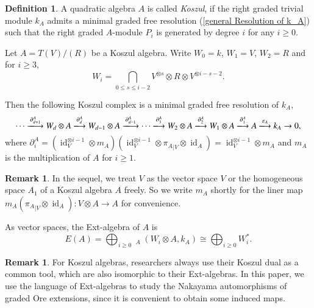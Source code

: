 \documentclass[a4paper,10pt]{amsart}
\theoremstyle{definition}
\newtheorem{definition}[theorem]{Definition}
\newtheorem{remark}[theorem]{Remark}
\numberwithin{equation}{section}
\DeclareMathOperator{\uHom}{\underline{Hom}}
\DeclareMathOperator{\id}{id}
\begin{document}
\begin{definition}
A quadratic algebra $A$ is called \emph{Koszul}, if the right graded trivial module $k_A$ admits a minimal graded free resolution (\ref{general Resolution of k_A}) such that the right graded $A$-module $P_i$ is generated by degree $i$ for any $i\geq0$.
\end{definition}

Let $A=T(V)/(R)$ be a Koszul algebra. Write $W_0=k$, $W_1=V$, $W_2=R$ and for $i\geq 3$,
$$
W_{i}=\bigcap_{0\leq s\leq i-2} V^{\otimes s}\otimes R\otimes V^{\otimes i-s-2}.
$$

Then the following Koszul complex is  a minimal graded free resolution of $k_A$,
$$
\cdots\xlongrightarrow{\partial_{d+1}^A} W_d\otimes A\xlongrightarrow{\partial^A_d}W_{d-1}\otimes A\xlongrightarrow{\partial^A_{d-1}}\cdots\xlongrightarrow{\partial^A_{3}}W_2\otimes A\xlongrightarrow{\partial^A_{2}}W_1\otimes A\xlongrightarrow{\partial^A_{1}}A\xlongrightarrow{\varepsilon_A}k_A\to0,
$$
where $\partial^A_{i}=(\id_V^{\otimes i-1}\otimes m_A)(\id_V^{\otimes i-1}\otimes{\pi_A}_{\mid V}\otimes\id_A)=\id_V^{\otimes i-1}\otimes m_A$ and $m_A$ is the multiplication of $A$ for $i\geq 1$.
\begin{remark}
In the sequel, we treat $V$ as the vector space $V$ or the homogeneous space $A_1$ of a Koszul algebra $A$ freely. So we write $m_A$ shortly for the liner map $m_A({\pi_A}_{\mid V}\otimes \id_A):V\otimes A\to A$ for convenience.
\end{remark}

As vector spaces, the Ext-algebra of $A$ is
$$
E(A)=\bigoplus_{i\geq0}\uHom_A(W_i\otimes A,k_A)\cong \bigoplus_{i\geq0} W_i^{*}.
$$

\begin{remark}
For Koszul algebras, researchers always use their Koszul dual as a common tool, which are also isomorphic to their Ext-algebras. In this paper, we use the language of Ext-algebras to study the Nakayama automorphisms of graded Ore extensions, since it is convenient to obtain some induced maps.
\end{remark}
%
\end{document}
